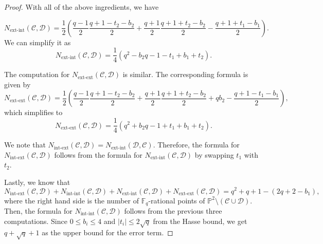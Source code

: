 \documentclass[11pt]{article}
\theoremstyle{definition}
\theoremstyle{definition}
\begin{document}
\begin{proof}
    With all of the above ingredients, we have 

    $$N_{\mathrm{ext\text{-}int}}(\mathcal C,\mathcal D)=\frac{1}{2}\left(\frac{q-1}{2}\frac{q+1-t_2-b_2}{2}+\frac{q+1}{2}\frac{q+1+t_2-b_2}{2}-\frac{q+1+t_1-b_1}{2}\right).$$
    We can simplify it as 
    $$N_{\mathrm{ext\text{-}int}}(\mathcal C,\mathcal D) = \frac{1}{4}\left(q^2-b_2q-1-t_1+b_1+t_2\right).$$

    The computation for $N_{\mathrm{ext\text{-}ext}}(\mathcal C,\mathcal D)$ is similar. The corresponding formula is given by 
    $$N_{\mathrm{ext\text{-}ext}}(\mathcal C,\mathcal D) = \frac{1}{2}\left(\frac{q-1}{2}\frac{q+1-t_2-b_2}{2} + \frac{q+1}{2}\frac{q+1+t_2-b_2}{2} + qb_2-\frac{q+1-t_1-b_1}{2}\right),$$
    which simplifies to
    $$N_{\mathrm{ext\text{-}ext}}(\mathcal C,\mathcal D) = \frac{1}{4}(q^2+b_2q-1+t_1+b_1+t_2).$$

    We note that $N_{\mathrm{int\text{-}ext}}(\mathcal{C}, \mathcal{D}) = N_{\mathrm{ext\text{-}int}}(\mathcal{D}, \mathcal{C})$. Therefore, the formula for $N_{\mathrm{int\text{-}ext}}(\mathcal{C}, \mathcal{D})$ follows from the formula for $N_{\mathrm{ext\text{-}int}}(\mathcal{C}, \mathcal{D})$ by swapping $t_1$ with $t_2$. 

    Lastly, we know that 
    $$N_{\mathrm{int\text{-}ext}}(\mathcal{C}, \mathcal{D}) + N_{\mathrm{int\text{-}int}}(\mathcal{C}, \mathcal{D}) + N_{\mathrm{ext\text{-}int}}(\mathcal{C}, \mathcal{D}) + N_{\mathrm{ext\text{-}ext}}(\mathcal{C}, \mathcal{D}) = q^2+q+1-(2q+2-b_1),$$
    where the right hand side is the number of $\mathbb{F}_q$-rational points of $\mathbb{P}^2\setminus (\mathcal C \cup \mathcal D )$. Then, the formula for $N_{\mathrm{int\text{-}int}}(\mathcal{C}, \mathcal{D})$ follows from the previous three computations. Since $0\leq b_i\leq 4$ and $|t_i|\leq 2\sqrt{q}$ from the Hasse bound, we get $q+\sqrt{q}+1$ as the upper bound for the error term. 
\end{proof}
\end{document}
